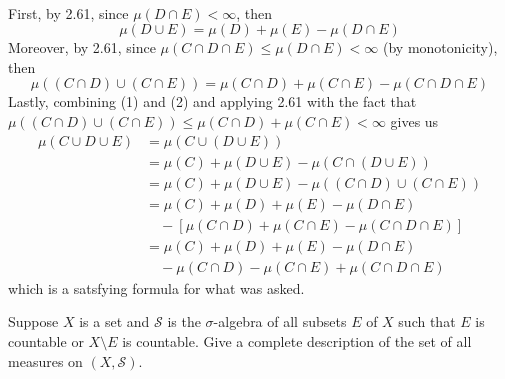 \begin{solution}
    \\ First, by 2.61, since $\mu(D \cap E) < \infty$, then 
    \[\mu(D \cup E) = \mu(D) + \mu(E) - \mu(D \cap E)\tag*{(1)}\]
    Moreover, by 2.61, since $\mu(C\cap D \cap E) \leq \mu(D \cap E) < \infty$ (by monotonicity), then 
    \[\mu((C \cap D) \cup (C \cap E)) = \mu(C \cap D) + \mu(C \cap E) - \mu(C \cap D \cap E)\tag*{(2)}\]
    Lastly, combining (1) and (2) and applying 2.61 with the fact that $\mu((C \cap D) \cup (C \cap E)) \leq \mu(C \cap D) + \mu(C \cap E) < \infty$ gives us
    \begin{align*}
        \mu(C \cup D \cup E) &= \mu( C \cup (D \cup E)) \\
        &= \mu(C) + \mu(D\cup E) - \mu(C\cap(D \cup E)) \\
        &= \mu(C) + \mu(D\cup E) - \mu((C \cap D) \cup (C \cap E)) \\
        &= \mu(C) + \mu(D) + \mu(E) - \mu(D \cap E)\\
        & \quad - [\mu(C \cap D) + \mu(C \cap E) - \mu(C \cap D \cap E)] \\
        &= \mu(C) + \mu(D) + \mu(E) - \mu(D \cap E)\\
        & \quad - \mu(C \cap D) - \mu(C \cap E) + \mu(C \cap D \cap E) 
    \end{align*}
    which is a satsfying formula for what was asked.\\
\end{solution}

\begin{exercise}
    Suppose $X$ is a set and $\mathcal{S}$ is the $\sigma$-algebra of all subsets $E$ of $X$ such that $E$ is countable or $X \setminus E$ is countable. Give a complete description of the set of all measures on $(X, \mathcal{S})$. \\
\end{exercise}

